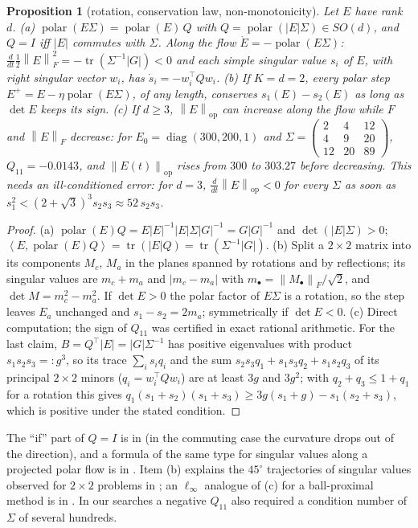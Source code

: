 \documentclass[11pt]{article}
\newtheorem{proposition}[theorem]{Proposition}
\theoremstyle{remark}
\newcommand{\nop}[1]{\left\|#1\right\|_{\mathrm{op}}}
\newcommand{\nF}[1]{\left\|#1\right\|_{F}}
\newcommand{\inner}[2]{\left\langle #1, #2 \right\rangle}
\newcommand{\abs}[1]{\left|#1\right|}
\newcommand{\tr}{\operatorname{tr}}
\newcommand{\diag}{\operatorname{diag}}
\newcommand{\polar}{\operatorname{polar}}
\begin{document}
\begin{proposition}[rotation, conservation law, non-monotonicity]\label{prop:Q}
Let $E$ have rank $d$. (a) $\polar(E\Sigma)=\polar(E)\,Q$ with $Q=\polar(\abs E\Sigma)\in SO(d)$, and $Q=I$ iff $\abs E$
commutes with $\Sigma$. Along the flow $\dot E=-\polar(E\Sigma)$: $\frac d{dt}\frac12\nF E^2=-\tr(\Sigma^{-1}\abs G)<0$ and
each simple singular value $s_i$ of $E$, with right singular vector $w_i$, has $\dot s_i=-w_i^\top Qw_i$.
(b) If $K=d=2$, every polar step $E^+=E-\eta\polar(E\Sigma)$, of any length, conserves $s_1(E)-s_2(E)$ as long as
$\det E$ keeps its sign.
(c) If $d\ge3$, $\nop{E}$ can increase along the flow while $F$ and $\nF E$ decrease: for $E_0=\diag(300,200,1)$ and
$\Sigma=\left(\begin{smallmatrix}2&4&12\\4&9&20\\12&20&89\end{smallmatrix}\right)$, $Q_{11}=-0.0143$, and $\nop{E(t)}$
rises from $300$ to $303.27$ before decreasing. This needs an ill-conditioned error: for $d=3$,
$\frac d{dt}\nop E<0$ for every $\Sigma$ as soon as $s_1^2<(2+\sqrt3)^3s_2s_3\approx52\,s_2s_3$.
\end{proposition}
\begin{proof}
(a) $\polar(E)Q=E\abs E^{-1}\abs E\Sigma\abs G^{-1}=G\abs G^{-1}$ and $\det(\abs E\Sigma)>0$;
$\inner E{\polar(E)Q}=\tr(\abs EQ)=\tr(\Sigma^{-1}\abs G)$. (b) Split a $2\times2$ matrix into its components $M_c$, $M_a$
in the planes spanned by rotations and by reflections; its singular values are $m_c+m_a$ and $\abs{m_c-m_a}$ with
$m_\bullet=\nF{M_\bullet}/\sqrt2$, and $\det M=m_c^2-m_a^2$. If $\det E>0$ the polar factor of $E\Sigma$ is a rotation, so
the step leaves $E_a$ unchanged and $s_1-s_2=2m_a$; symmetrically if $\det E<0$. (c) Direct computation; the sign of
$Q_{11}$ was certified in exact rational arithmetic. For the last claim, $B=Q^\top\abs E=\abs G\Sigma^{-1}$ has positive
eigenvalues with product $s_1s_2s_3=:g^3$, so its trace $\sum_is_iq_i$ and the sum
$s_2s_3q_1+s_1s_3q_2+s_1s_2q_3$ of its principal $2\times2$ minors ($q_i=w_i^\top Qw_i$) are at least $3g$ and $3g^2$;
with $q_2+q_3\le1+q_1$ for a rotation this gives $q_1(s_1+s_2)(s_1+s_3)\ge3g(s_1+g)-s_1(s_2+s_3)$, which is positive
under the stated condition.
\end{proof}
The ``if'' part of $Q=I$ is in \cite{shulgin2026quadratic} (in the commuting case the curvature drops out of the
direction), and a formula of the same type for singular values along a projected polar flow is in
\cite{beneventano2026spectral}. Item (b) explains the $45^\circ$ trajectories of singular values observed for $2\times2$
problems in \cite{shulgin2026quadratic}; an $\ell_\infty$ analogue of (c) for a ball-proximal method is in
\cite{gruntkowska2025broximal}. In our searches a negative $Q_{11}$ also required a condition number of $\Sigma$ of
several hundreds.
\end{document}
